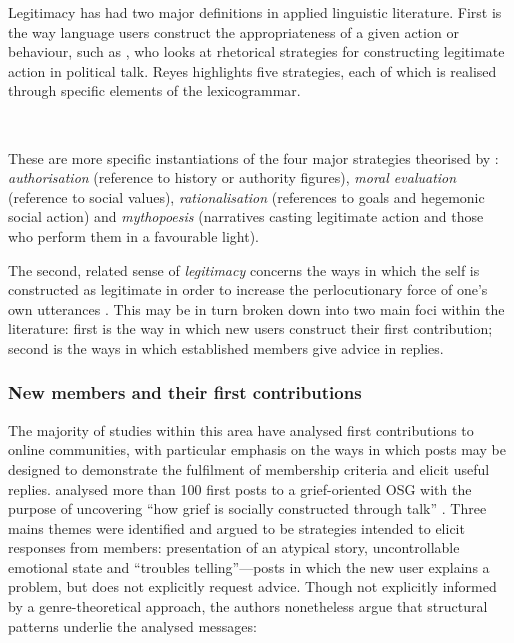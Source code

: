 		 Legitimacy has had two major definitions in applied linguistic literature. First is the way language users construct the appropriateness of a given action or behaviour, such as \textcite[p.~782]{reyes_strategies_2011}, who looks at rhetorical strategies for constructing legitimate action in political talk. Reyes highlights five strategies, each of which is realised through specific elements of the lexicogrammar.

		 ~\\

		 These are more specific instantiations of the four major strategies theorised by \textcite[p.~92]{van_leeuwen_legitimation_2007}: \emph{authorisation} (reference to history or authority figures), \emph{moral evaluation} (reference to social values), \emph{rationalisation} (references to goals and hegemonic social action) and \emph{mythopoesis} (narratives casting legitimate action and those who perform them in a favourable light). %

		 The second, related sense of \emph{legitimacy} concerns the ways in which the self is constructed as legitimate in order to increase the perlocutionary force of one's own utterances \cite{austin_how_1975,roberts_communicative_1996}. This may be in turn broken down into two main foci within the literature: first is the way in which new users construct their first contribution; second is the ways in which established members give advice in replies.

		 \subsubsection{New members and their first contributions}

		 The majority of studies within this area have analysed first contributions to online communities, with particular emphasis on the ways in which posts may be designed to demonstrate the fulfilment of membership criteria and elicit useful replies.  analysed more than 100 first posts to a grief-oriented OSG with the purpose of uncovering ``how grief is socially constructed through talk'' \citeyear[p.~2]{varga_grieving_2013}. Three mains themes were identified and argued to be strategies intended to elicit responses from members: presentation of an atypical story, uncontrollable emotional state and ``troubles telling''---posts in which the new user explains a problem, but does not explicitly request advice. Though not explicitly informed by a genre-theoretical approach, the authors nonetheless argue that structural patterns underlie the analysed messages:

